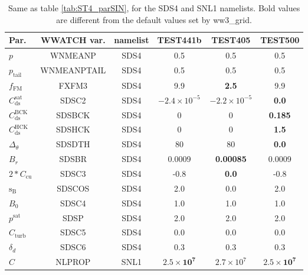\begin{table} \begin{center}
\begin{tabular}{|l|c|c|c|c|c|} \hline \hline
Par.         &  WWATCH var. & namelist & TEST441b & TEST405  & TEST500 \\
\hline
  $p$                               &  WNMEANP        & SDS4 & 0.5                   & 0.5 &  0.5    \\
  $p_{\mathrm{tail}}$               &  WNMEANPTAIL    & SDS4 & 0.5                   & 0.5 &  0.5 \\
  $f_{\mathrm{FM}}$                 &  FXFM3          & SDS4 & 9.9                   & \textbf{2.5} &  9.9  \\
  $C_{\mathrm{ds}}^{\mathrm{sat}}$  & SDSC2           & SDS4 & $-2.4\times 10^{-5}$  & $-2.2\times 10^{-5}$  & \textbf{0.0} \\
  $C_{\mathrm{ds}}^{\mathrm{BCK}}$  & SDSBCK          & SDS4 & 0                     & 0  & \textbf{0.185} \\
  $C_{\mathrm{ds}}^{\mathrm{HCK}}$  & SDSHCK           & SDS4 & 0                    & 0  & \textbf{1.5} \\
  $\Delta_\theta$                   &  SDSDTH         & SDS4 & 80                    & 80 & \textbf{0.0}  \\
  $B_r$                             &  SDSBR          & SDS4 & 0.0009                & \textbf{0.00085} & 0.0009    \\
  $2*C_{\mathrm{cu}}$               & SDSC3           & SDS4 & -0.8                  & \textbf{0.0}    & -0.8    \\
  ${\mathrm{s_B}}$                  & SDSCOS           &SDS4 & 2.0                   &  0.0 & 2.0 \\
   $B_0$                             &  SDSC4          & SDS4 & 1.0                  & 1.0 & 1.0   \\
  $p^{\mathrm{sat}}$                &  SDSP           & SDS4 & 2.0  & 2.0 &  2.0   \\
  $C_{\mathrm{turb}}$               & SDSC5           & SDS4  & 0.0 & 0.0 &  0.0   \\
  $\delta_d$                        & SDSC6           & SDS4  & 0.3 & 0.3 &  0.3   \\
  $C$                               & NLPROP          & SNL1  & $\mathbf{2.5\times 10^7}$ & $2.7\times 10^7$  & $\mathbf{2.5\times 10^7}$   \\
 \hline \hline
\end{tabular} \end{center}
\caption{Same as table \ref{tab:ST4_parSIN}, for the SDS4 and SNL1 namelists. Bold values are different from the 
default values set by ww3\_grid.} \label{tab:ST4_parSDS}
\end{table}



